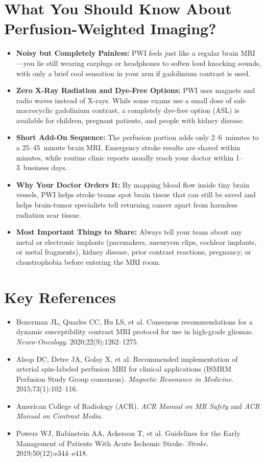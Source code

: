 \section{What You Should Know About Perfusion-Weighted Imaging?}

\begin{itemize}
    \item \textbf{Noisy but Completely Painless:} PWI feels just like a regular brain MRI---you lie still wearing earplugs or headphones to soften loud knocking sounds, with only a brief cool sensation in your arm if gadolinium contrast is used.
    \item \textbf{Zero X-Ray Radiation and Dye-Free Options:} PWI uses magnets and radio waves instead of X-rays. While some exams use a small dose of safe macrocyclic gadolinium contrast, a completely dye-free option (ASL) is available for children, pregnant patients, and people with kidney disease.
    \item \textbf{Short Add-On Sequence:} The perfusion portion adds only 2--6~minutes to a 25--45~minute brain MRI. Emergency stroke results are shared within minutes, while routine clinic reports usually reach your doctor within 1--3~business days.
    \item \textbf{Why Your Doctor Orders It:} By mapping blood flow inside tiny brain vessels, PWI helps stroke teams spot brain tissue that can still be saved and helps brain-tumor specialists tell returning cancer apart from harmless radiation scar tissue.
    \item \textbf{Most Important Things to Share:} Always tell your team about any metal or electronic implants (pacemakers, aneurysm clips, cochlear implants, or metal fragments), kidney disease, prior contrast reactions, pregnancy, or claustrophobia before entering the MRI room.
\end{itemize}

\section{Key References}

\begin{itemize}
    \item Boxerman JL, Quarles CC, Hu LS, et al. Consensus recommendations for a dynamic susceptibility contrast MRI protocol for use in high-grade gliomas. \textit{Neuro-Oncology}. 2020;22(9):1262--1275.
    \item Alsop DC, Detre JA, Golay X, et al. Recommended implementation of arterial spin-labeled perfusion MRI for clinical applications (ISMRM Perfusion Study Group consensus). \textit{Magnetic Resonance in Medicine}. 2015;73(1):102--116.
    \item American College of Radiology (ACR). \textit{ACR Manual on MR Safety} and \textit{ACR Manual on Contrast Media}.
    \item Powers WJ, Rabinstein AA, Ackerson T, et al. Guidelines for the Early Management of Patients With Acute Ischemic Stroke. \textit{Stroke}. 2019;50(12):e344--e418.
\end{itemize}
